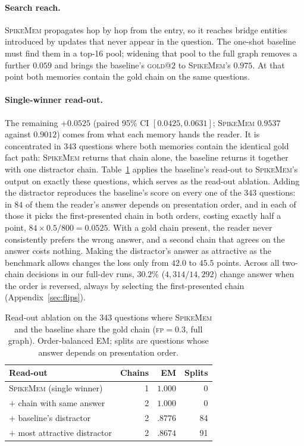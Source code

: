 \documentclass[11pt]{article}
\makeatletter
\newcommand{\goldtwo}{\textsc{gold@}$2$}
\newcommand{\sm}{\textsc{SpikeMem}}
\makeatother
\begin{document}
\paragraph{Search reach.}
\sm{} propagates hop by hop from the entry, so it reaches bridge entities introduced by updates that
never appear in the question. The one-shot baseline must find them in a top-16 pool; widening that
pool to the full graph removes a further $0.059$ and brings the baseline's \goldtwo{} to \sm{}'s
$0.975$. At that point both memories contain the gold chain on the same questions.

\paragraph{Single-winner read-out.}
The remaining $+0.0525$ (paired 95\% CI $[0.0425, 0.0631]$; \sm{} $0.9537$ against $0.9012$) comes
from what each memory hands the reader. It is concentrated in $343$ questions where both memories
contain the identical gold fact path: \sm{} returns that chain alone, the baseline returns it together
with one distractor chain. Table~\ref{tab:readout} applies the baseline's read-out to \sm{}'s output on
exactly these questions, which serves as the read-out ablation. Adding the distractor reproduces the
baseline's score on every one of the $343$ questions: in $84$ of them the reader's answer depends on
presentation order, and in each of those it picks the first-presented chain in both orders, costing
exactly half a point, $84\times0.5/800=0.0525$. With a gold chain present, the reader never
consistently prefers the wrong answer, and a second chain that agrees on the answer costs nothing.
Making the distractor's answer as attractive as the benchmark allows changes the loss only from $42.0$
to $45.5$ points. Across all two-chain decisions in our full-dev runs, $30.2\%$ ($4{,}314/14{,}292$)
change answer when the order is reversed, always by selecting the first-presented chain
(Appendix~\ref{sec:flips}).

\begin{table}[t]
\centering
\caption{Read-out ablation on the $343$ questions where \sm{} and the baseline share the gold chain
(\textsc{fp}$=0.3$, full graph). Order-balanced EM; splits are questions whose answer depends on
presentation order.}
\label{tab:readout}
\small
\setlength{\tabcolsep}{3pt}
\begin{tabular}{@{}lrrr@{}}
\toprule
Read-out & Chains & EM & Splits \\
\midrule
\sm{} (single winner)        & 1 & $1.000$ & 0 \\
$+$ chain with same answer   & 2 & $1.000$ & 0 \\
$+$ baseline's distractor    & 2 & $.8776$ & 84 \\
$+$ most attractive distractor & 2 & $.8674$ & 91 \\
\bottomrule
\end{tabular}
\end{table}
\end{document}
